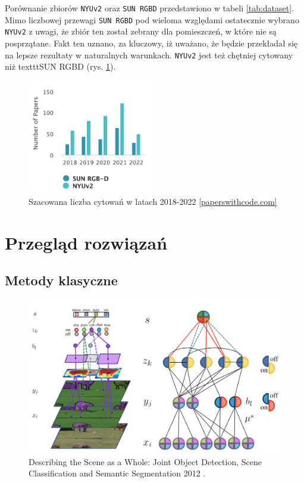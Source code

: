 Porównanie zbiorów \texttt{NYUv2} oraz \texttt{SUN RGBD} przedstawiono w tabeli \ref{tab:dataset}. Mimo liczbowej przewagi \texttt{SUN RGBD} pod wieloma względami ostatecznie wybrano \texttt{NYUv2} z uwagi, że zbiór ten został zebrany dla pomieszczeń, w które nie są posprzątane. Fakt ten uznano, za kluczowy, iż uważano, że będzie przekładał się na lepsze rezultaty w naturalnych warunkach. \texttt{NYUv2} jest też chętniej cytowany niż texttt{SUN RGBD} (rys. \ref{fig:sun-vs-nyu}).

\begin{figure}
    \centering
    \includegraphics[width=0.5\textwidth]{images/stats-dataset.png}
    \caption[]{Szacowana liczba cytowań w latach 2018-2022 \href{https://paperswithcode.com/dataset/sun-rgb-d}{[paperswithcode.com]}}
    \label{fig:sun-vs-nyu}
\end{figure}

\section{Przegląd rozwiązań}
\subsection{Metody klasyczne}
\begin{figure}
    \includegraphics[width=\textwidth]{images/joint-segmentation-and-classification.png}
    \caption{Describing the Scene as a Whole: Joint Object Detection, Scene Classification and Semantic Segmentation 2012 \cite{yao2012describing}.}
    \label{fig:old-school-arch}
\end{figure}


